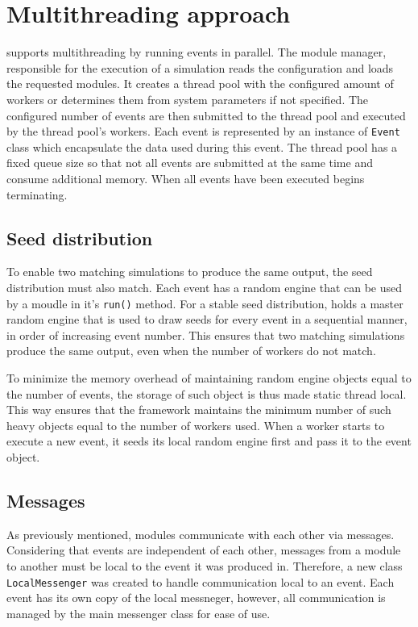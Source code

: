 
\section{Multithreading approach}
\label{sec:multithreading_approach}
\apsq supports multithreading by running events in parallel.
The module manager, responsible for the execution of a simulation reads the configuration and loads the requested modules.
It creates a thread pool with the configured amount of workers or determines them from system parameters if not specified.
The configured number of events are then submitted to the thread pool and executed by the thread pool's workers.
Each event is represented by an instance of \texttt{Event} class which encapsulate the data used during this event.
The thread pool has a fixed queue size so that not all events are submitted at the same time and consume additional memory.
When all events have been executed \apsq begins terminating.

\subsection{Seed distribution}
To enable two matching simulations to produce the same output, the seed distribution must also match.
Each event has a random engine that can be used by a moudle in it's \texttt{run()} method.
For a stable seed distribution, \apsq holds a master random engine that is used to draw seeds for every event in a sequential manner,
in order of increasing event number.
This ensures that two matching simulations produce the same output, even when the number of workers do not match.

To minimize the memory overhead of maintaining random engine objects equal to the number of events, the storage of such object is thus made static thread local.
This way ensures that the framework maintains the minimum number of such heavy objects equal to the number of workers used.
When a worker starts to execute a new event, it seeds its local random engine first and pass it to the event object.

\subsection{Messages}
As previously mentioned, modules communicate with each other via messages.
Considering that events are independent of each other, messages from a module to another must be local to the event it was produced in.
Therefore, a new class \texttt{LocalMessenger} was created to handle communication local to an event.
Each event has its own copy of the local messneger, however, all communication is managed by the main messenger class for ease of use.

